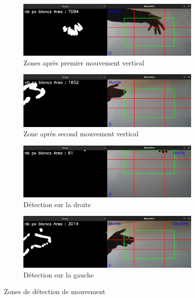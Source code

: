 \documentclass[a4paper, 11pt, french]{article}
\begin{document}
\begin{figure}
    \begin{subfigure}[b]{0.48\textwidth}
        \includegraphics[width=\textwidth]{detectionHautSecond.png}
        \caption{Zones après premier mouvement vertical}
        \label{fig:detectionHautSecond}
    \end{subfigure}
    \begin{subfigure}[b]{0.48\textwidth}
        \includegraphics[width=\textwidth]{detectionHautTroisieme.png}
        \caption{Zone après second mouvement vertical}
        \label{fig:detectionHautTroisieme}
    \end{subfigure}

    \vspace*{7mm}

    \begin{subfigure}[b]{0.48\textwidth}
        \includegraphics[width=\textwidth]{detectionDroite.png}
        \caption{Détection sur la droite}
        \label{fig:detectionDroite}
    \end{subfigure}
    \begin{subfigure}[b]{0.48\textwidth}
        \includegraphics[width=\textwidth]{detectionGauche.png}
        \caption{Détection sur la gauche}
        \label{fig:detectionGauche}
    \end{subfigure}

    \caption{Zones de détection de mouvement}
    \label{fig:detectionArea}
  \end{figure}
\end{document}
